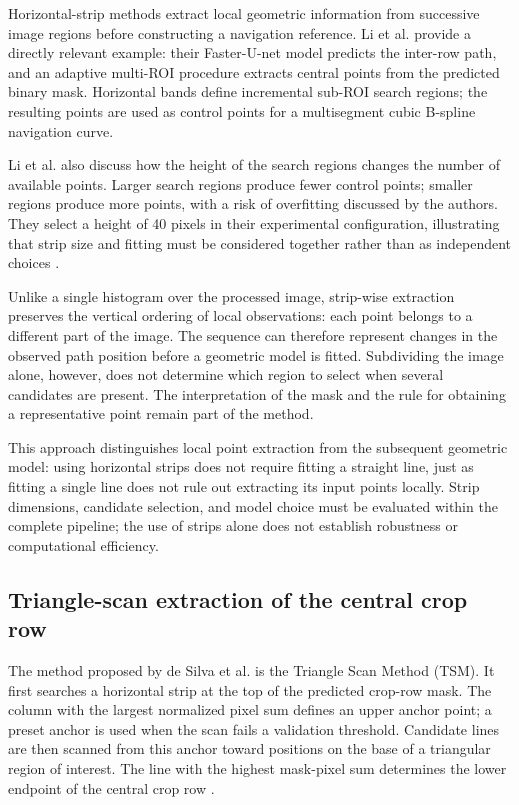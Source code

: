 Horizontal-strip methods extract local geometric information from
successive image regions before constructing a navigation reference.
Li et al. provide a directly relevant example: their Faster-U-net model
predicts the inter-row path, and an adaptive multi-ROI procedure extracts
central points from the predicted binary mask. Horizontal bands define
incremental sub-ROI search regions; the resulting points are used as
control points for a multisegment cubic B-spline navigation curve.

Li et al. also discuss how the height of the search regions changes the
number of available points. Larger search regions produce fewer
control points; smaller regions produce more points, with a risk of
overfitting discussed by the authors. They select a height of 40 pixels
in their experimental configuration, illustrating that strip size and
fitting must be considered together rather than as independent choices
\cite[Section~2.2.3, Figure~9]{li2022multiroi}.

Unlike a single histogram over the processed image, strip-wise
extraction preserves the vertical ordering of local observations: each
point belongs to a different part of the image. The sequence can
therefore represent changes in the observed path position before a
geometric model is fitted. Subdividing the image alone, however, does
not determine which region to select when several candidates are
present. The interpretation of the mask and the rule for obtaining a
representative point remain part of the method.

This approach distinguishes local point extraction from the subsequent
geometric model: using horizontal strips does not require fitting a
straight line, just as fitting a single line does not rule out extracting
its input points locally. Strip dimensions, candidate selection, and
model choice must be evaluated within the complete pipeline; the use of
strips alone does not establish robustness or computational efficiency.

\subsection{Triangle-scan extraction of the central crop row}
\label{subsec:triangle_scan}

The method proposed by de Silva et al. is the Triangle Scan Method (TSM).
It first searches a horizontal strip at the top of the predicted crop-row
mask. The column with the largest normalized pixel sum defines an upper
anchor point; a preset anchor is used when the scan fails a validation
threshold. Candidate lines are then scanned from this anchor toward
positions on the base of a triangular region of interest. The line with
the highest mask-pixel sum determines the lower endpoint of the central
crop row \cite[Section~4.2]{silva2023rowdetection}.

